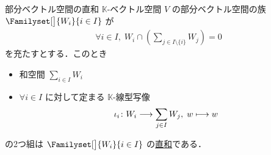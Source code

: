 \documentclass[rep_main]{subfiles}
\begin{document}
\begin{myprop}[label=prop:subvec-directsum,breakable]{部分ベクトル空間の直和}
    $\mathbb{K}$-ベクトル空間 $V$ の部分ベクトル空間の族 $\Familyset[\big]{W_i}{i \in I}$ が
    \begin{align}
        \label{eq:subvec-directsum}
        \forall i \in I,\; W_i \cap \left(\sum_{j \in I \setminus \{i\}} W_j\right) = 0
    \end{align}
    を充たすとする．このとき
    \begin{itemize}
        \item 和空間 $\sum_{i \in I} W_i$
        \item $\forall i \in I$ に対して定まる $\mathbb{K}$-線型写像
        \begin{align}
            \iota_i \colon W_i \longrightarrow \sum_{j \in I} W_j,\; w \longmapsto w
        \end{align}
    \end{itemize}
    の2つ組は $\Familyset[\big]{W_i}{i \in I}$ の\hyperref[def:univ-vec-sum]{直和}である．
\end{myprop}

\end{document}
